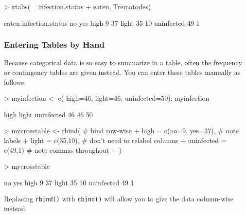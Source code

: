 \begin{Schunk}
\begin{Sinput}
> xtabs( ~ infection.status + eaten, Trematodes)
\end{Sinput}
\begin{Soutput}
                eaten
infection.status no yes
      high        9  37
      light      35  10
      uninfected 49   1
\end{Soutput}
\end{Schunk}

\subsubsection*{Entering Tables by Hand}

Because categorical data is so easy to summarize in a table, 
often the frequency or contingency tables are given instead.
You can enter these tables manually as follows:


\begin{Schunk}
\begin{Sinput}
> myinfection <- c( high=46, light=46, uninfected=50); myinfection
\end{Sinput}
\begin{Soutput}
      high      light uninfected 
        46         46         50 
\end{Soutput}
\end{Schunk}

\label{R:make-xtabs}%
\begin{Schunk}
\begin{Sinput}
> mycrosstable <- rbind(                        # bind row-wise
+                   high = c(no=9, yes=37),     # note labels
+                   light = c(35,10),           # don't need to relabel columns
+                   uninfected = c(49,1)        # note commas throughout
+ 			)
\end{Sinput}
\end{Schunk}

\begin{Schunk}
\begin{Sinput}
> mycrosstable
\end{Sinput}
\begin{Soutput}
           no yes
high        9  37
light      35  10
uninfected 49   1
\end{Soutput}
\end{Schunk}
Replacing \verb!rbind()! with \verb!cbind()! will allow you to give the data
column-wise instead.

